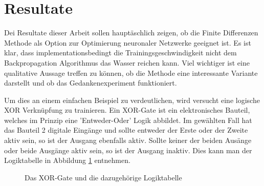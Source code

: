 \section{Resultate
	\label{ableitung:section:resultate}}
Dei Resultate dieser Arbeit sollen hauptäschlich zeigen, ob die Finite Differenzen Methode als Option zur Optimierung neuronaler Netzwerke geeignet ist. Es ist klar, dass implementationsbedingt die Trainingsgeschwindigkeit nicht dem Backpropagation Algorithmus das Wasser reichen kann. Viel wichtiger ist eine qualitative Aussage treffen zu können, ob die Methode eine interessante Variante darstellt und ob das Gedankenexperiment funktioniert.

Um dies an einem einfachen Beispiel zu verdeutlichen, wird versucht eine logische XOR Verknüpfung zu trainieren. Ein XOR-Gate ist ein elektronisches Bauteil, welches im Prinzip eine 'Entweder-Oder' Logik abbildet. Im gewählten Fall hat das Bauteil 2 digitale Eingänge und sollte entweder der Erste oder der Zweite aktiv sein, so ist der Ausgang ebenfalls aktiv. Sollte keiner der beiden Ausänge oder beide Ausgänge aktiv sein, so ist der Ausgang inaktiv. Dies kann man der Logiktabelle in Abbildung \ref{ableitung:fig:xor-gate-logic} entnehmen.
\begin{figure}[h]
	 \centering
	\caption{Das XOR-Gate und die dazugehörige Logiktabelle}
	\label{ableitung:fig:xor-gate-logic}
\end{figure}
